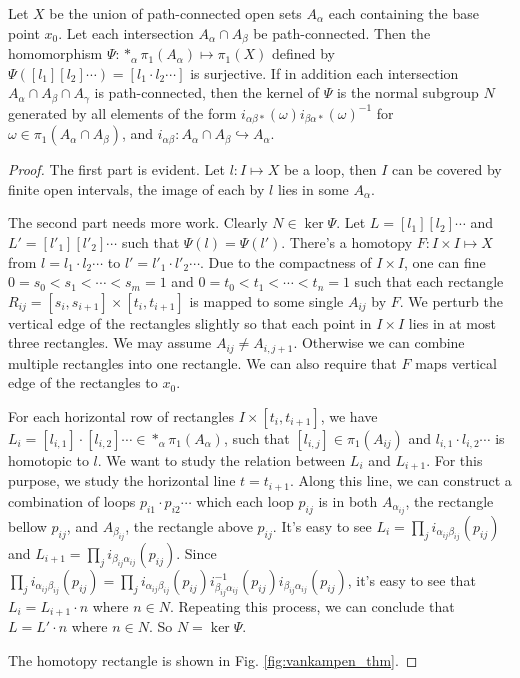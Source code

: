 \documentclass[12pt]{book}
\begin{document}
\begin{theorem}
	Let $X$ be the union of path-connected open sets $A_\alpha$ each containing the base point $x_0$. Let each intersection $A_\alpha\cap A_\beta$ be path-connected. Then the homomorphism $\Psi:* _\alpha \pi_1(A_\alpha)\mapsto \pi_1(X)$ defined by $\Psi([l_1][l_2]\cdots)=[l_1\cdot l_2\cdots]$ is surjective. If in addition each intersection $A_\alpha\cap A_\beta\cap A_\gamma$ is path-connected, then the kernel of $\Psi$ is the normal subgroup $N$ generated by all elements of the form $i_{\alpha\beta*}(\omega)i_{\beta\alpha*}(\omega)^{-1}$ for $\omega\in \pi_1(A_\alpha\cap A_\beta)$, and $i_{\alpha\beta}:A_\alpha\cap A_\beta\hookrightarrow A_\alpha$.
\end{theorem}
\begin{proof}
	The first part is evident. Let $l:I\mapsto X$ be a loop, then $I$ can be covered by finite open intervals, the image of each by $l$ lies in some $A_\alpha$.
	
	The second part needs more work. Clearly $N\in\ker\Psi$. Let $L=[l_1][l_2]\cdots$ and $L'=[l'_1][l'_2]\cdots$ such that $\Psi(l)=\Psi(l')$. There's a homotopy $F:I\times I\mapsto X$ from $l=l_1\cdot l_2\cdots$ to $l'=l'_1\cdot l'_2\cdots$. Due to the compactness of $I\times I$, one can fine $0=s_0<s_1<\cdots<s_m=1$ and $0=t_0<t_1<\cdots<t_n=1$ such that each rectangle $R_{ij}=[s_i,s_{i+1}]\times[t_i,t_{i+1}]$ is mapped to some single $A_{ij}$ by $F$. We perturb the vertical edge of the rectangles slightly so that each point in $I\times I$ lies in at most three rectangles. We may assume $A_{ij}\neq A_{i,j+1}$. Otherwise we can combine multiple rectangles into one rectangle. We can also require that $F$ maps vertical edge of the rectangles to $x_0$.
	
	For each horizontal row of rectangles $I\times[t_i,t_{i+1}]$, we have $L_i=[l_{i,1}]\cdot[l_{i,2}]\cdots\in* _\alpha \pi_1(A_\alpha)$, such that $[l_{i,j}]\in \pi_1(A_{ij})$ and $l_{i,1}\cdot l_{i,2}\cdots$ is homotopic to $l$. We want to study the relation between $L_i$ and $L_{i+1}$. For this purpose, we study the horizontal line $t=t_{i+1}$. Along this line, we can construct a combination of loops $p_{i1}\cdot p_{i2}\cdots$ which each loop  $p_{ij}$ is in both $ A_{\alpha_{ij}}$, the rectangle bellow $p_{ij}$, and $A_{\beta_{ij}}$, the rectangle above $p_{ij}$. It's easy to see $L_i=\prod_ji_{\alpha_{ij}\beta_{ij}}(p_{ij})$ and $L_{i+1}=\prod_ji_{\beta_{ij}\alpha_{ij}}(p_{ij})$. Since $\prod_ji_{\alpha_{ij}\beta_{ij}}(p_{ij})=\prod_ji_{\alpha_{ij}\beta_{ij}}(p_{ij})i^{-1}_{\beta_{ij}\alpha_{ij}}(p_{ij})i_{\beta_{ij}\alpha_{ij}}(p_{ij})$, it's easy to see that $L_i=L_{i+1}\cdot n$ where $n\in N$. Repeating this process, we can conclude that $L=L'\cdot n$ where $n\in N$. So $N=\ker\Psi$.
	
	The homotopy rectangle is shown in Fig. \ref{fig:vankampen_thm}.
	
\end{proof}
\end{document}
